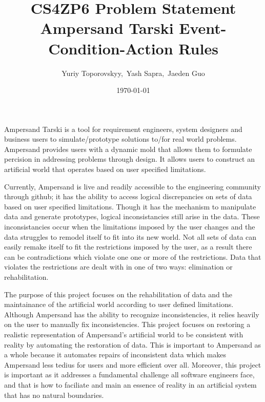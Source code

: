 \documentclass[12pt]{article}
\begin{document}
\title{CS4ZP6 Problem Statement \\ Ampersand Tarski Event-Condition-Action Rules } 
\author{Yuriy Toporovskyy,\ Yash Sapra,\ Jaeden Guo}
\date{\today}
\thispagestyle{empty}
\maketitle

Ampersand Tarski is a tool for requirement engineers, system designers and 
business users to simulate/prototype solutions to/for real world problems. 
Ampersand provides users with a dynamic mold that allows them to 
formulate percision in addressing problems through design. It allows users to 
construct an artificial world that operates based on user specified limitations.

Currently, Ampersand is live and readily accessible to the engineering 
community through github; it has the ability to access logical discrepancies on 
sets of data based on user specified limitations. Though it has the mechanism 
to manipulate data and generate prototypes, logical inconsistancies still arise 
in the data. These inconsistancies occur when the limitations imposed by the 
user changes and the data struggles to remodel itself to fit into its new 
world. Not all sets of data can easily remake itself to fit the restrictions 
imposed by the user, as a result there can be contradictions which violate one 
one or more of the restrictions. Data that violates the restrictions are dealt 
with in one of two ways: elimination or rehabilitation.

The purpose of this project focuses on the rehabilitation of data and the 
maintainance of the artificial world according to user defined limitations. 
Although Ampersand has the ability to recognize inconsistencies, it relies 
heavily on the user to manually fix inconsistencies. This project focuses on 
restoring a realistic representation of Ampersand's artificial world to be 
consistent with reality by automating the restoration of data. This is 
important to Ampersand as a whole because it automates repairs of inconsistent 
data which makes Ampersand less tedius for users and more efficient over all. 
Moreover, this project is important as it addresses a fundamental 
challenge all software engineers face, and that is how to faciliate and main an 
essence of reality in an artificial system that has no natural boundaries. 
\end{document}
